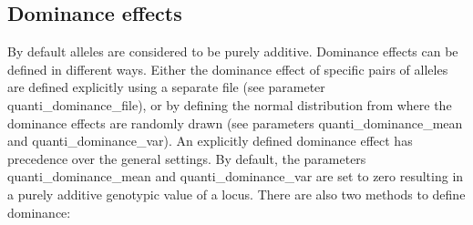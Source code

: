 \documentclass[letterpaper,12pt,oneside]{book}
\begin{document}
\subsection{Dominance effects}
By default alleles are considered to be purely additive. Dominance effects can be defined in different ways. Either the dominance effect of specific pairs of alleles are defined explicitly using a separate file (see parameter \textsf{quanti\_dominance\_file}), or by defining the normal distribution from where the dominance effects are randomly drawn (see parameters \textsf{quanti\_dominance\_mean} and \textsf{quanti\_dominance\_var}). An explicitly defined dominance effect has precedence over the general settings. By default, the parameters \textsf{quanti\_dominance\_mean} and \textsf{quanti\_dominance\_var} are set to zero resulting in a purely additive genotypic value of a locus. There are also two methods to define dominance:
\end{document}
